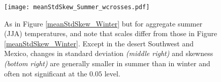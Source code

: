 \documentclass{ametsoc}
\newcommand\smallfigwidth{\columnwidth}
\begin{document}
\begin{figure}[ht]
\centerline{\texttt{[image: meanStdSkew\_Summer\_wcrosses.pdf]}}
\caption{\small{As in Figure \ref{meanStdSkew_Winter} but for aggregate summer (JJA) temperatures, and note that scales differ from those in Figure \ref{meanStdSkew_Winter}. Except in the desert Southwest and Mexico, changes in standard deviation \emph{(middle right)} and skewness \emph{(bottom right)} are generally smaller in summer than in winter and often not significant at the $0.05$ level.}}
\label{meanStdSkew_Summer}
\end{figure}




\end{document}
